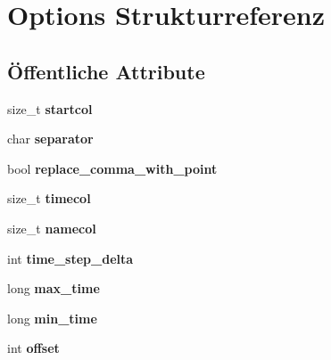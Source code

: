 \hypertarget{structOptions}{\section{Options Strukturreferenz}
\label{structOptions}
}
\subsection*{Öffentliche Attribute}
\begin{DoxyCompactItemize}
\item 
\hypertarget{structOptions_aded46eef44aad228c4b264484a6d2574}{size\-\_\-t {\bfseries startcol}}\label{structOptions_aded46eef44aad228c4b264484a6d2574}

\item 
\hypertarget{structOptions_a17973c998446a9796a53914aefa49597}{char {\bfseries separator}}\label{structOptions_a17973c998446a9796a53914aefa49597}

\item 
\hypertarget{structOptions_aa6020ddc44ebf6f3ea07672316ade79b}{bool {\bfseries replace\-\_\-comma\-\_\-with\-\_\-point}}\label{structOptions_aa6020ddc44ebf6f3ea07672316ade79b}

\item 
\hypertarget{structOptions_ae9476a2b60887e04b7c3e23b5679f751}{size\-\_\-t {\bfseries timecol}}\label{structOptions_ae9476a2b60887e04b7c3e23b5679f751}

\item 
\hypertarget{structOptions_abe3b2c6e574a544d59e350b0fa0fb472}{size\-\_\-t {\bfseries namecol}}\label{structOptions_abe3b2c6e574a544d59e350b0fa0fb472}

\item 
\hypertarget{structOptions_a85fb3cb3ce74a5166990340370fc178e}{int {\bfseries time\-\_\-step\-\_\-delta}}\label{structOptions_a85fb3cb3ce74a5166990340370fc178e}

\item 
\hypertarget{structOptions_a953d62af3c63d4af468461a12ab3cf67}{long {\bfseries max\-\_\-time}}\label{structOptions_a953d62af3c63d4af468461a12ab3cf67}

\item 
\hypertarget{structOptions_a79c8b17733baeef1f09fd12b62d23c98}{long {\bfseries min\-\_\-time}}\label{structOptions_a79c8b17733baeef1f09fd12b62d23c98}

\item 
\hypertarget{structOptions_a87b8dfdf8c72d1dddea45f81e244f451}{int {\bfseries offset}}\label{structOptions_a87b8dfdf8c72d1dddea45f81e244f451}


\end{DoxyCompactItemize}
